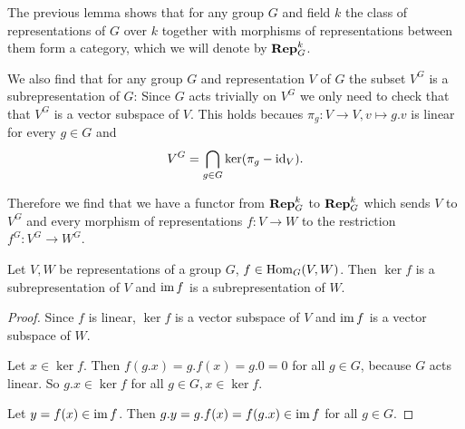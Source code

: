 The previous lemma shows that for any group $G$ and field $k$ the class of representations of $G$ over $k$ together with morphisms of representations between them form a category, which we will denote by $\mathbf{Rep}^k_G$.


We also find that for any group $G$ and representation $V$ of $G$ the subset $V^G$ is a subrepresentation of $G$: Since $G$ acts trivially on $V^G$ we only need to check that that $V^G$ is a vector subspace of $V$. This holds becaues $\pi_g \colon V \to V, v \mapsto g.v$ is linear for every $g \in G$ and
\[
 V^G = \bigcap_{g \in G} \ker(\pi_g - \operatorname{id}_V).
\]

Therefore we find that we have a functor from $\mathbf{Rep}^k_G$ to $\mathbf{Rep}^k_G$ which sends $V$ to $V^G$ and every morphism of representations $f \colon V \to W$ to the restriction $f^G \colon V^G \to W^G$.


\begin{lem}\label{lem: ker and im subrepresentations}
 Let $V,W$ be representations of a group $G$, $f \in \operatorname{Hom}_G(V,W)$. Then $\ker f$ is a subrepresentation of $V$ and $\operatorname{im} f$ is a subrepresentation of $W$.
\end{lem}
\begin{proof}
 Since $f$ is linear, $\ker f$ is a vector subspace of $V$ and $\operatorname{im} f$ is a vector subspace of $W$.
 
 Let $x \in \ker f$. Then $f(g.x) = g.f(x) = g.0 = 0$ for all $g \in G$, because $G$ acts linear. So $g.x \in \ker f$ for all $g \in G, x \in \ker f$.
 
 Let $y = f(x) \in \operatorname{im} f$. Then $g.y = g.f(x) = f(g.x) \in \operatorname{im} f$ for all $g \in G$.
\end{proof}


